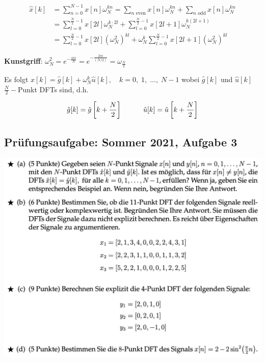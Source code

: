 \documentclass[11pt]{article}
\begin{document}
\begin{align*}
    \hat{x}[k] &= \sum_{n=0}^{N-1} x[n]\omega_N^{kn} = \sum_{n\text{ even}} x[n]\omega_N^{kn} + \sum_{n\text{ odd}} x[n]\omega_N^{kn} \\
    &= \sum_{l=0}^{\frac{N}{2}-1} x[2l]\omega_N^{k\cdot 2l} + \sum_{l=0}^{\frac{N}{2}-1} x[2l+1]\omega_N^{k(2l+1)} \\
    &= \sum_{l=0}^{\frac{N}{2}-1}x[2l]\left(\omega_N^2\right)^{kl} + \omega_N^k \sum_{l=0}^{\frac{N}{2}-1} x[2l+1] \left(\omega_N^2\right)^{kl}
\end{align*}

\textbf{Kunstgriff}: $\omega_N^2 = e^{-\frac{4 \pi i}{N}} = e^{-\frac{2 \pi i}{(N/2)}} = \omega_{\frac{N}{2}}$


Es folgt $\hat{x}[k] = \hat{g}[k] + \omega_N^k \hat{u}[k], \hspace{12pt} k = 0, \; 1, \; \dots, \; N-1$ wobei $\hat{g}[k]$ und $\hat{u}[k]$ $\frac{N}{2}-$Punkt DFTs sind, d.h.

$$\hat{g}[k] = \hat{g}\left[k + \frac{N}{2}\right] \hspace*{30pt} \hat{u}[k] = \hat{u}\left[k + \frac{N}{2}\right]$$

\subsection*{Prüfungsaufgabe: Sommer 2021, Aufgabe 3}
\vspace*{-0.5cm}
\includegraphics[width=\linewidth]{docimgs/Sommer21_3.png}
\end{document}
